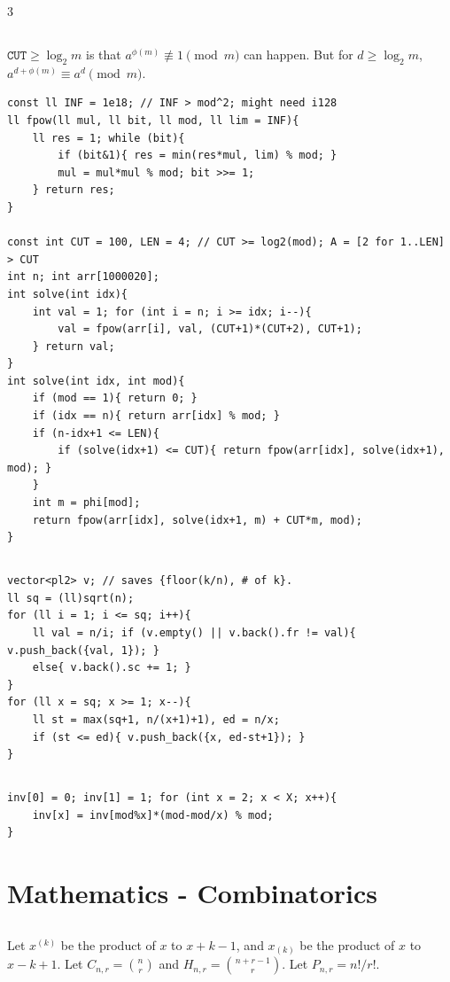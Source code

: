 \documentclass[landscape, 8pt, a4paper, oneside]{extarticle}
\begin{document}
\begin{multicols*}{3}
\subsection{}
$\mathtt{CUT} \ge \log_2 m$ is that $a^{\phi(m)} \not\equiv 1 \pmod m$ can happen. But for $d \ge \log_2 m$, $a^{d+\phi(m)} \equiv a^{d} \pmod m$.
\begin{verbatim}
const ll INF = 1e18; // INF > mod^2; might need i128
ll fpow(ll mul, ll bit, ll mod, ll lim = INF){
	ll res = 1; while (bit){
		if (bit&1){ res = min(res*mul, lim) % mod; }
		mul = mul*mul % mod; bit >>= 1;
	} return res;
}

const int CUT = 100, LEN = 4; // CUT >= log2(mod); A = [2 for 1..LEN] > CUT
int n; int arr[1000020];
int solve(int idx){
	int val = 1; for (int i = n; i >= idx; i--){
		val = fpow(arr[i], val, (CUT+1)*(CUT+2), CUT+1);
	} return val;
}
int solve(int idx, int mod){
	if (mod == 1){ return 0; }
	if (idx == n){ return arr[idx] % mod; }
	if (n-idx+1 <= LEN){
		if (solve(idx+1) <= CUT){ return fpow(arr[idx], solve(idx+1), mod); }
	}
	int m = phi[mod];
	return fpow(arr[idx], solve(idx+1, m) + CUT*m, mod);
}
\end{verbatim}
\subsection{}
\begin{verbatim}
vector<pl2> v; // saves {floor(k/n), # of k}.
ll sq = (ll)sqrt(n);
for (ll i = 1; i <= sq; i++){
	ll val = n/i; if (v.empty() || v.back().fr != val){ v.push_back({val, 1}); }
	else{ v.back().sc += 1; }
}
for (ll x = sq; x >= 1; x--){
	ll st = max(sq+1, n/(x+1)+1), ed = n/x;
	if (st <= ed){ v.push_back({x, ed-st+1}); }
}
\end{verbatim}
\subsection{}
\begin{verbatim}
inv[0] = 0; inv[1] = 1; for (int x = 2; x < X; x++){
    inv[x] = inv[mod%x]*(mod-mod/x) % mod;
}
\end{verbatim}
\section{Mathematics - Combinatorics}
\subsection{}
Let $x^{(k)}$ be the product of $x$ to $x+k-1$, and $x_{(k)}$ be the product of $x$ to $x-k+1$.
Let $C_{n, r} = \binom{n}{r}$ and $H_{n, r} = \binom{n+r-1}{r}$. Let $P_{n, r} = n! / r!$.


\end{multicols*}
\end{document}
